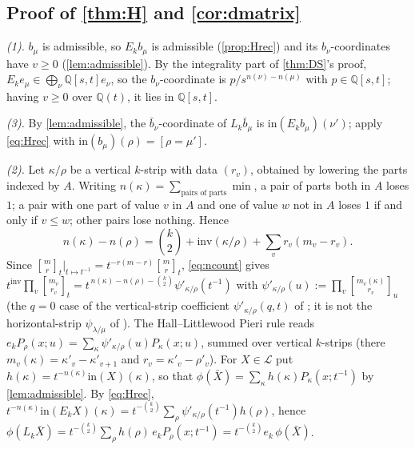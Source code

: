\documentclass[11pt]{amsart}
\theoremstyle{definition}
\theoremstyle{remark}
\numberwithin{equation}{section}
\newcommand{\qbin}[2]{\genfrac{[}{]}{0pt}{}{#1}{#2}_t}
\begin{document}
\subsection{Proof of \cref{thm:H} and \cref{cor:dmatrix}}
\emph{(1).} $b_\mu$ is admissible, so $E_kb_\mu$ is admissible (\cref{prop:Hrec}) and its $b_\nu$-coordinates have $v\ge0$ (\cref{lem:admissible}). By the integrality part of \cref{thm:DS}'s proof, $E_ke_\mu\in\bigoplus_\nu\mathbb{Q}[s,t]e_\nu$, so the $b_\nu$-coordinate is $p/s^{n(\nu)-n(\mu)}$ with $p\in\mathbb{Q}[s,t]$; having $v\ge0$ over $\mathbb{Q}(t)$, it lies in $\mathbb{Q}[s,t]$.

\emph{(3).} By \cref{lem:admissible}, the $\bar b_\nu$-coordinate of $L_k\bar b_\mu$ is $\mathrm{in}(E_kb_\mu)(\nu')$; apply \eqref{eq:Hrec} with $\mathrm{in}(b_\mu)(\rho)=[\rho=\mu']$.

\emph{(2).} Let $\kappa/\rho$ be a vertical $k$-strip with data $(r_v)$, obtained by lowering the parts indexed by $A$. Writing $n(\kappa)=\sum_{\text{pairs of parts}}\min$, a pair of parts both in $A$ loses $1$; a pair with one part of value $v$ in $A$ and one of value $w$ not in $A$ loses $1$ if and only if $v\le w$; other pairs lose nothing. Hence
\begin{equation}\label{eq:ncount}
n(\kappa)-n(\rho)=\binom k2+\mathrm{inv}(\kappa/\rho)+\sum_vr_v(m_v-r_v).
\end{equation}
Since $\qbin mr\big|_{t\mapsto t^{-1}}=t^{-r(m-r)}\qbin mr$, \eqref{eq:ncount} gives $t^{\mathrm{inv}}\prod_v\qbin{m_v}{r_v}=t^{\,n(\kappa)-n(\rho)-\binom k2}\psi'_{\kappa/\rho}(t^{-1})$ with $\psi'_{\kappa/\rho}(u):=\prod_v\genfrac{[}{]}{0pt}{}{m_v(\kappa)}{r_v}_u$ (the $q=0$ case of the vertical-strip coefficient $\psi'_{\kappa/\rho}(q,t)$ of \cite[VI (6.24)(iv)]{Macdonald95}; it is not the horizontal-strip $\psi_{\lambda/\mu}$ of \cite[III (5.8$'$)]{Macdonald95}). The Hall--Littlewood Pieri rule \cite[III (3.2)]{Macdonald95} reads $e_kP_\rho(x;u)=\sum_\kappa\psi'_{\kappa/\rho}(u)P_\kappa(x;u)$, summed over vertical $k$-strips (there $m_v(\kappa)=\kappa'_v-\kappa'_{v+1}$ and $r_v=\kappa'_v-\rho'_v$). For $X\in\mathcal L$ put $h(\kappa)=t^{-n(\kappa)}\mathrm{in}(X)(\kappa)$, so that $\phi(\bar X)=\sum_\kappa h(\kappa)P_\kappa(x;t^{-1})$ by \cref{lem:admissible}. By \eqref{eq:Hrec}, $t^{-n(\kappa)}\mathrm{in}(E_kX)(\kappa)=t^{-\binom k2}\sum_\rho\psi'_{\kappa/\rho}(t^{-1})h(\rho)$, hence $\phi(L_k\bar X)=t^{-\binom k2}\sum_\rho h(\rho)\,e_kP_\rho(x;t^{-1})=t^{-\binom k2}e_k\,\phi(\bar X)$.
\end{document}
